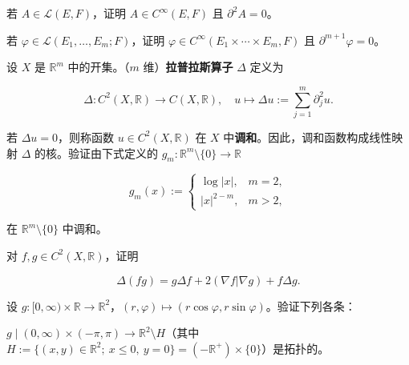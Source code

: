 \exerciseshead

\begin{exercises}
\item

若 $ A \in \mathcal{L}(E, F) $，证明 $ A \in C^{\infty}(E, F) $ 且 $ \partial^{2}A = 0 $。

\item

若 $ \varphi \in \mathcal{L}(E_{1}, \ldots, E_{m}; F) $，证明 $ \varphi \in C^{\infty}(E_{1} \times \cdots \times E_{m}, F) $ 且 $ \partial^{m+1}\varphi = 0 $。

\item

设 $ X $ 是 $ \mathbb{R}^{m} $ 中的开集。（$ m $ 维）\textbf{拉普拉斯算子} $ \Delta $ 定义为

\[
\Delta : C^{2}(X, \mathbb{R}) \to C(X, \mathbb{R}) , \quad u \mapsto \Delta u := \sum_{j=1}^{m}\partial_{j}^{2}u .
\]

若 $ \Delta u = 0 $，则称函数 $ u \in C^{2}(X, \mathbb{R}) $ 在 $ X $ 中\textbf{调和}。因此，调和函数构成线性映射 $ \Delta $ 的核。验证由下式定义的 $ g_{m} : \mathbb{R}^{m} \setminus \{0\} \to \mathbb{R} $

\begin{equation*}
g_{m}(x) := \begin{cases} \log|x| , & m = 2 , \\ |x|^{2-m} , & m > 2 , \end{cases}
\end{equation*}

在 $ \mathbb{R}^{m} \setminus \{0\} $ 中调和。

\item

对 $ f, g \in C^{2}(X, \mathbb{R}) $，证明

\[
\Delta(fg) = g\Delta f + 2(\nabla f|\nabla g) + f\Delta g .
\]
\item

设 $ g : [0, \infty) \times \mathbb{R} \to \mathbb{R}^{2} $，$ (r, \varphi) \mapsto (r\cos\varphi, r\sin\varphi) $。验证下列各条：

\begin{items}
\item

$ g \mid (0, \infty) \times (-\pi, \pi) \to \mathbb{R}^{2} \setminus H $（其中 $ H := \{(x, y) \in \mathbb{R}^{2} ; \ x \le 0, \ y = 0\} = (-\mathbb{R}^{+}) \times \{0\} $）是拓扑的。

\item


\end{items}
\end{exercises}
